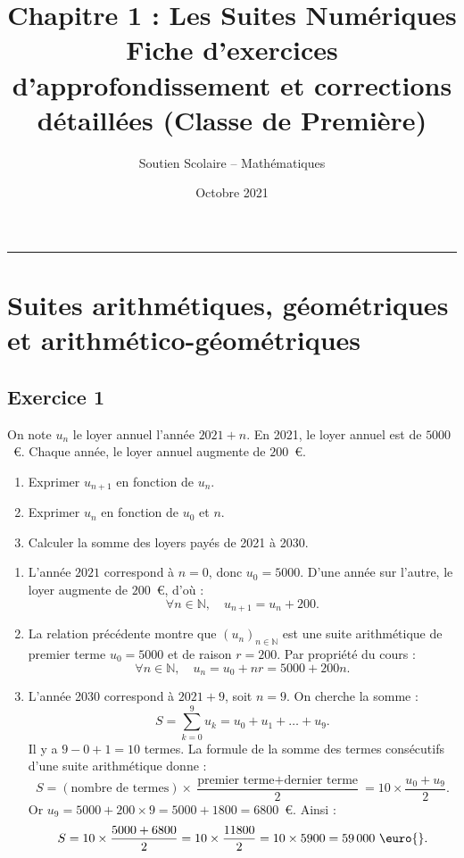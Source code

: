 \documentclass[11pt,a4paper]{article}
\title{\textbf{Chapitre 1 : Les Suites Numériques}\\\large Fiche d'exercices d'approfondissement et corrections détaillées (Classe de Première)}
\author{Soutien Scolaire -- Mathématiques}
\date{Octobre 2021}
\newcommand{\N}{\mathbb{N}}
\begin{document}
\maketitle

\tableofcontents
\vspace{1cm}
\hrule
\vspace{1cm}

\section{Suites arithmétiques, géométriques et arithmético-géométriques}

\subsection*{Exercice 1}
On note $u_n$ le loyer annuel l'année $2021 + n$. En 2021, le loyer annuel est de $5000$~\euro{}. Chaque année, le loyer annuel augmente de $200$~\euro{}.
\begin{enumerate}
    \item Exprimer $u_{n+1}$ en fonction de $u_n$.
    \item Exprimer $u_n$ en fonction de $u_0$ et $n$.
    \item Calculer la somme des loyers payés de 2021 à 2030.
\end{enumerate}

\begin{correctionbox}
\begin{enumerate}
    \item L'année $2021$ correspond à $n=0$, donc $u_0 = 5000$. D'une année sur l'autre, le loyer augmente de $200$~\euro{}, d'où :
    \[
    \forall n \in \N, \quad u_{n+1} = u_n + 200.
    \]
    \item La relation précédente montre que $(u_n)_{n \in \N}$ est une suite arithmétique de premier terme $u_0 = 5000$ et de raison $r = 200$. Par propriété du cours :
    \[
    \forall n \in \N, \quad u_n = u_0 + n r = 5000 + 200n.
    \]
    \item L'année 2030 correspond à $2021 + 9$, soit $n = 9$. On cherche la somme :
    \[
    S = \sum_{k=0}^9 u_k = u_0 + u_1 + \dots + u_9.
    \]
    Il y a $9 - 0 + 1 = 10$ termes. La formule de la somme des termes consécutifs d'une suite arithmétique donne :
    \[
    S = (\text{nombre de termes}) \times \frac{\text{premier terme} + \text{dernier terme}}{2} = 10 \times \frac{u_0 + u_9}{2}.
    \]
    Or $u_9 = 5000 + 200 \times 9 = 5000 + 1800 = 6800$~\euro{}. Ainsi :
    \[
    S = 10 \times \frac{5000 + 6800}{2} = 10 \times \frac{11800}{2} = 10 \times 5900 = 59\,000\text{~\euro{}}.
    \]
\end{enumerate}
\end{correctionbox}
\end{document}
